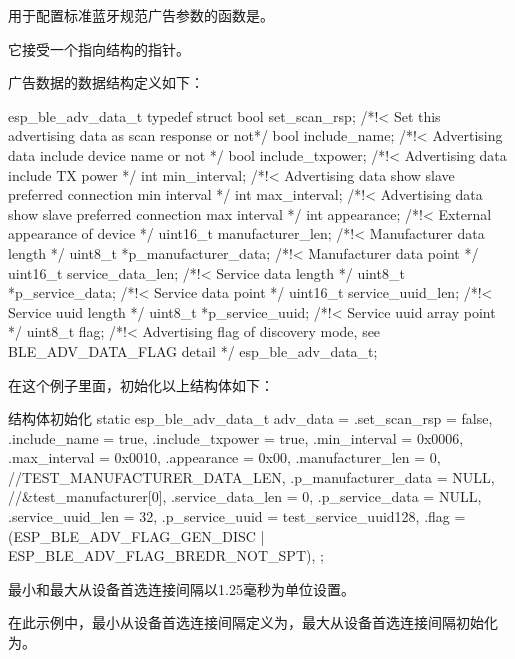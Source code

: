 \documentclass[lang=cn,newtx,10pt,scheme=chinese]{elegantbook}
\begin{document}
用于配置标准蓝牙规范广告参数的函数是。

它接受一个指向结构的指针。

广告数据的数据结构定义如下：

\begin{mycode}{esp\_ble\_adv\_data\_t}
typedef struct {
    bool set_scan_rsp;            /*!< Set this advertising data as scan response or not*/
    bool include_name;            /*!< Advertising data include device name or not */
    bool include_txpower;         /*!< Advertising data include TX power */
    int min_interval;             /*!< Advertising data show slave preferred connection min interval */
    int max_interval;             /*!< Advertising data show slave preferred connection max interval */
    int appearance;               /*!< External appearance of device */
    uint16_t manufacturer_len;    /*!< Manufacturer data length */
    uint8_t *p_manufacturer_data; /*!< Manufacturer data point */
    uint16_t service_data_len;    /*!< Service data length */
    uint8_t *p_service_data;      /*!< Service data point */
    uint16_t service_uuid_len;    /*!< Service uuid length */
    uint8_t *p_service_uuid;      /*!< Service uuid array point */
    uint8_t flag;                 /*!< Advertising flag of discovery mode, see BLE_ADV_DATA_FLAG detail */
} esp_ble_adv_data_t;
\end{mycode}

在这个例子里面，初始化以上结构体如下：

\begin{mycode}{结构体初始化}
static esp_ble_adv_data_t adv_data = {
    .set_scan_rsp = false,
    .include_name = true,
    .include_txpower = true,
    .min_interval = 0x0006,
    .max_interval = 0x0010,
    .appearance = 0x00,
    .manufacturer_len = 0, //TEST_MANUFACTURER_DATA_LEN,
    .p_manufacturer_data =  NULL, //&test_manufacturer[0],
    .service_data_len = 0,
    .p_service_data = NULL,
    .service_uuid_len = 32,
    .p_service_uuid = test_service_uuid128,
    .flag = (ESP_BLE_ADV_FLAG_GEN_DISC | ESP_BLE_ADV_FLAG_BREDR_NOT_SPT),
};
\end{mycode}

最小和最大从设备首选连接间隔以1.25毫秒为单位设置。

在此示例中，最小从设备首选连接间隔定义为，最大从设备首选连接间隔初始化为。
\end{document}

